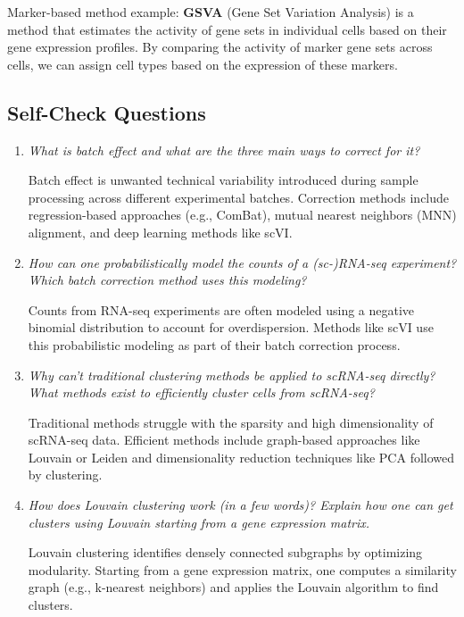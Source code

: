 \documentclass[a4paper]{article}
\begin{document}
Marker-based method example: \textbf{GSVA} (Gene Set Variation Analysis) is a method
that estimates the activity of gene sets in individual cells based on their
gene expression profiles. By comparing the activity of marker gene sets
across cells, we can assign cell types based on the expression of these
markers.


\subsection*{Self-Check Questions}

\begin{enumerate}
    \item \textit{What is batch effect and what are the three main ways to correct for it?}  
    
    Batch effect is unwanted technical variability introduced during sample processing across different experimental batches.  
    Correction methods include regression-based approaches (e.g., ComBat), mutual nearest neighbors (MNN) alignment, and deep learning methods like scVI.

    \item \textit{How can one probabilistically model the counts of a (sc-)RNA-seq experiment? Which batch correction method uses this modeling?}  
    
    Counts from RNA-seq experiments are often modeled using a negative binomial distribution to account for overdispersion.  
    Methods like scVI use this probabilistic modeling as part of their batch correction process.  

    \item \textit{Why can't traditional clustering methods be applied to scRNA-seq directly? What methods exist to efficiently cluster cells from scRNA-seq?}  
    
    Traditional methods struggle with the sparsity and high dimensionality of scRNA-seq data.  
    Efficient methods include graph-based approaches like Louvain or Leiden and dimensionality reduction techniques like PCA followed by clustering.  

    \item \textit{How does Louvain clustering work (in a few words)? Explain how one can get clusters using Louvain starting from a gene expression matrix.}  
    
    Louvain clustering identifies densely connected subgraphs by optimizing modularity.  
    Starting from a gene expression matrix, one computes a similarity graph (e.g., k-nearest neighbors) and applies the Louvain algorithm to find clusters.  


\end{enumerate}
\end{document}
